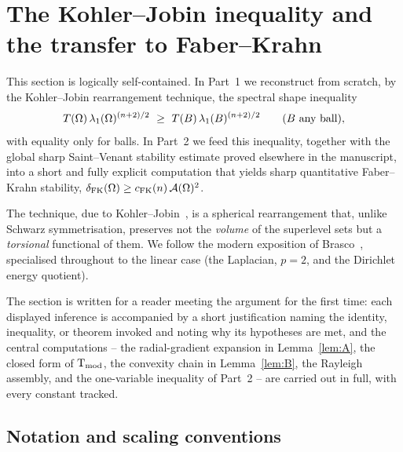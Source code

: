 \section{The Kohler--Jobin inequality and the transfer to Faber--Krahn}
\label{sec:kj}

This section is logically self-contained. In Part~1 we reconstruct from
scratch, by the Kohler--Jobin rearrangement technique, the spectral shape
inequality
\[
  T(\Om)\,\lambda_1(\Om)^{(n+2)/2}\ \ge\ T(B)\,\lambda_1(B)^{(n+2)/2}
  \qquad(B\text{ any ball}),
\]
with equality only for balls. In Part~2 we feed this inequality, together
with the global sharp Saint--Venant stability estimate proved elsewhere in
the manuscript, into a short and fully explicit computation that yields
sharp quantitative Faber--Krahn stability,
$\delta_{\mathrm{FK}}(\Omega)\ge c_{\mathrm{FK}}(n)\,\mathcal A(\Omega)^2$.

The technique, due to Kohler--Jobin~\cite{KJ1,KJ2,KJ3}, is a spherical
rearrangement that, unlike Schwarz symmetrisation, preserves not the
\emph{volume} of the superlevel sets but a \emph{torsional} functional of
them. We follow the modern exposition of Brasco~\cite[\S\S3--5,
Thm.~1.1]{Brasco2014}, specialised throughout to the linear case (the
Laplacian, $p=2$, and the Dirichlet energy quotient).

The section is written for a reader meeting the argument for the first
time: each displayed inference is accompanied by a short justification
naming the identity, inequality, or theorem invoked and noting why its
hypotheses are met, and the central computations -- the radial-gradient
expansion in Lemma~\ref{lem:A}, the closed form of $\operatorname{T_{\mathrm{mod}}}$, the convexity
chain in Lemma~\ref{lem:B}, the Rayleigh assembly, and the one-variable
inequality of Part~2 -- are carried out in full, with every constant
tracked.

\subsection{Notation and scaling conventions}
\label{ssec:kj-notation}

